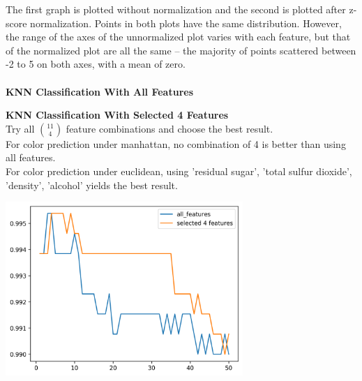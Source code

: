 \documentclass[12pt]{article}
\begin{document}
\noindent
The first graph is plotted without normalization and the second is plotted after z-score normalization. Points in both plots have the same distribution. However, the range of the axes of the unnormalized plot varies with each feature, but that of the normalized plot are all the same -- the majority of points scattered between -2 to 5 on both axes, with a mean of zero.\\\\
\textbf{KNN Classification With All Features}
\begin{figure}[H]
\captionsetup[subfigure]{labelformat=empty}
\centering
{}
\end{figure}
\vspace*{-1.5cm}
\noindent
\textbf{KNN Classification With Selected 4 Features}\\
Try all ${11 \choose 4}$ feature combinations and choose the best result.\\
For color prediction under manhattan, no combination of 4 is better than using all features.\\
For color prediction under euclidean, using 'residual sugar', 'total sulfur dioxide', 'density', 'alcohol' yields the best result.
\begin{center}
    \includegraphics[width=9cm]{./select4features/color_e.png}
\end{center}
\end{document}
